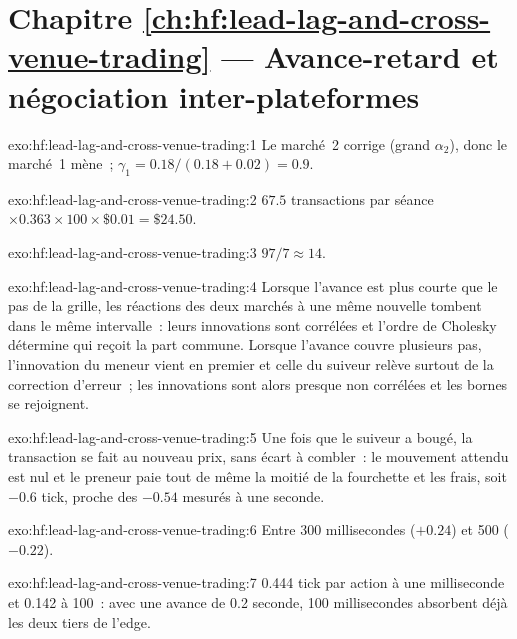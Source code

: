 \section*{Chapitre \ref{ch:hf:lead-lag-and-cross-venue-trading} --- Avance-retard et négociation inter-plateformes}

\begin{solution}{exo:hf:lead-lag-and-cross-venue-trading:1}
Le marché~2 corrige (grand $\alpha_2$), donc le marché~1 mène~; $\gamma_1=0.18/(0.18+0.02)=0.9$.
\end{solution}

\begin{solution}{exo:hf:lead-lag-and-cross-venue-trading:2}
$67.5$ transactions par séance $\times0.363\times100\times\$0.01=\$24.50$.
\end{solution}

\begin{solution}{exo:hf:lead-lag-and-cross-venue-trading:3}
$97/7\approx14$.
\end{solution}

\begin{solution}{exo:hf:lead-lag-and-cross-venue-trading:4}
Lorsque l'avance est plus courte que le pas de la grille, les réactions des deux marchés à une même nouvelle tombent dans le même intervalle~: leurs innovations sont
corrélées et l'ordre de Cholesky détermine qui reçoit la part commune. Lorsque l'avance couvre plusieurs pas, l'innovation du meneur vient en premier et
celle du suiveur relève surtout de la correction d'erreur~; les innovations sont alors presque non corrélées et les bornes se rejoignent.
\end{solution}

\begin{solution}{exo:hf:lead-lag-and-cross-venue-trading:5}
Une fois que le suiveur a bougé, la transaction se fait au nouveau prix, sans écart à combler~: le mouvement attendu est nul et le preneur paie tout de même la
moitié de la fourchette et les frais, soit $-0.6$ tick, proche des $-0.54$ mesurés à une seconde.
\end{solution}

\begin{solution}{exo:hf:lead-lag-and-cross-venue-trading:6}
Entre 300 millisecondes ($+0.24$) et 500 ($-0.22$).
\end{solution}

\begin{solution}{exo:hf:lead-lag-and-cross-venue-trading:7}
0.444 tick par action à une milliseconde et 0.142 à 100~: avec une avance de 0.2 seconde, 100 millisecondes absorbent déjà les deux tiers de l'edge.
\end{solution}

